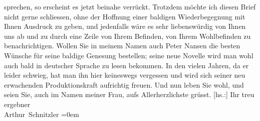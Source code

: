 \begin{ledgroupsized}[t]{13cm}
               sprechen, so erscheint es jetzt beinahe verrückt. Trotzdem möchte ich diesen Brief
               nicht gerne schliessen, ohne der Hoffnung einer baldigen Wiederbegegnung mit Ihnen
               Ausdruck zu geben, und jedenfalls wäre es sehr liebenswürdig von Ihnen uns ab und zu
               durch eine Zeile von Ihrem Befinden, von Ihrem Wohlbefinden zu benachrichtigen.
               Wollen Sie in meinem Namen auch Peter Nansen die
               besten Wünsche für seine baldige Genesung bestellen; seine neue Novelle wird man wohl auch bald in deutscher
               Sprache zu lesen bekommen. In den vielen Jahren, da er leider schwieg, hat man ihn
               hier keineswegs vergessen\strikeout{,} und wird sich seiner neu
               erwachenden Produktionskraft aufrichtig freuen.\pend
           \pstart
           Und nun leben Sie wohl, und seien Sie, auch im Namen meiner Frau, aufs Allerherzlichste grüsst.\pend
           \pstart
           {[}hs.:{]} Ihr treu ergebner{\\[\baselineskip]}\spacefill\mbox{Arthur Schnitzler}\pend
           \leftskip=0em{}
         
         \endnumbering{}\end{ledgroupsized}  \newcommand{\dateiname}{L02222}\newcommand{\titel}{Arthur Schnitzler an Georg Brandes, 9. 12. 1915}\newcommand{\editorInnen}{ Martin Anton Müller und Gerd-Hermann Susen}
      